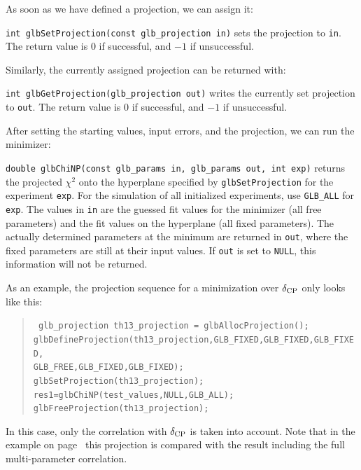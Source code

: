 As soon as we have defined a projection, we can assign it:
\begin{function}
{\tt int glbSetProjection(const glb\_projection in)} sets the projection
to {\tt in}. The return value is $0$ if successful, and $-1$ if
unsuccessful.
\end{function}
Similarly, the currently assigned projection can be returned with:
\begin{function}
{\tt int glbGetProjection(glb\_projection out)} writes the currently
set projection to {\tt out}. The return value is $0$ if successful, and $-1$ if unsuccessful.
\end{function}
After setting the starting values, input errors, and the projection, 
we can run the minimizer:
\begin{function}
{\tt double glbChiNP(const glb\_params in, glb\_params out, int exp)} 
returns the projected $\chi^2$ onto the hyperplane specified by 
{\tt glbSetProjection} for the  experiment {\tt exp}. 
For the simulation of all initialized experiments,
use {\tt GLB\_ALL} for {\tt exp}. The values in {\tt in} are the guessed fit values for the minimizer (all free parameters) and the fit values
on the hyperplane (all fixed parameters). The actually determined parameters at the minimum are returned in {\tt out}, where the fixed parameters are still at their input values. If {\tt out} is set to {\tt NULL}, this information will not be returned.
\end{function}
As an example, the projection sequence for a minimization over
$\delta_{\mathrm{CP}}$ only looks like this:
\begin{quote}
{\tt
  glb\_projection th13\_projection = glbAllocProjection(); \\
  glbDefineProjection(th13\_projection,GLB\_FIXED,GLB\_FIXED,GLB\_FIXED,\\
  \hspace*{2cm} GLB\_FREE,GLB\_FIXED,GLB\_FIXED); \\
  glbSetProjection(th13\_projection); \\ 
  res1=glbChiNP(test\_values,NULL,GLB\_ALL); \\
  glbFreeProjection(th13\_projection);
}
\end{quote}
In this case, only the correlation with $\delta_{\mathrm{CP}}$ is taken into account.
Note that in the  example on page~\pageref{ex:corrproj} this projection
is compared with the result including the full multi-parameter correlation.

